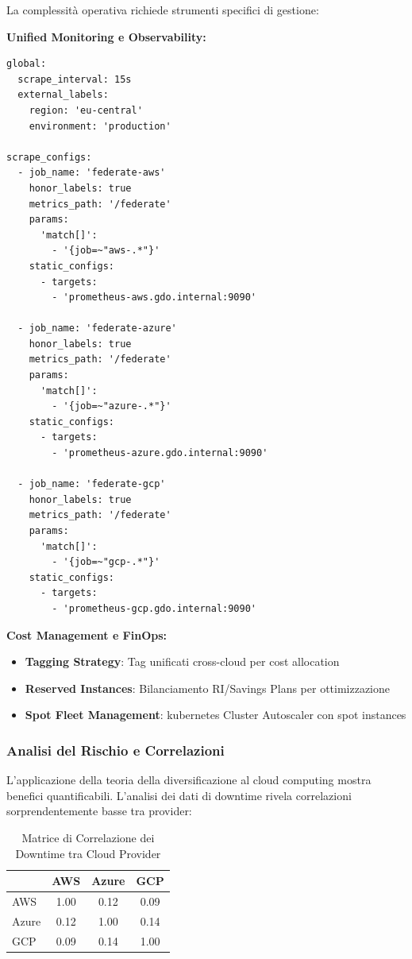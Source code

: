 La complessità operativa richiede strumenti specifici di gestione:

\textbf{Unified Monitoring e Observability:}
\begin{lstlisting}[caption={Prometheus Federation per Multi-Cloud},label={lst:prometheus_federation}]
global:
  scrape_interval: 15s
  external_labels:
    region: 'eu-central'
    environment: 'production'

scrape_configs:
  - job_name: 'federate-aws'
    honor_labels: true
    metrics_path: '/federate'
    params:
      'match[]':
        - '{job=~"aws-.*"}'
    static_configs:
      - targets:
        - 'prometheus-aws.gdo.internal:9090'
        
  - job_name: 'federate-azure'
    honor_labels: true
    metrics_path: '/federate'
    params:
      'match[]':
        - '{job=~"azure-.*"}'
    static_configs:
      - targets:
        - 'prometheus-azure.gdo.internal:9090'
        
  - job_name: 'federate-gcp'
    honor_labels: true
    metrics_path: '/federate'
    params:
      'match[]':
        - '{job=~"gcp-.*"}'
    static_configs:
      - targets:
        - 'prometheus-gcp.gdo.internal:9090'
\end{lstlisting}

\textbf{Cost Management e FinOps:}
\begin{itemize}
    \item \textbf{Tagging Strategy}: Tag unificati cross-cloud per cost allocation
    \item \textbf{Reserved Instances}: Bilanciamento RI/Savings Plans per ottimizzazione
    \item \textbf{Spot Fleet Management}: \gls{kubernetes} Cluster Autoscaler con spot instances
\end{itemize}

\subsubsection{\texorpdfstring{\textbf{Analisi del Rischio e Correlazioni}}{3.4.2.4 - Analisi del Rischio e Correlazioni}}

L'applicazione della teoria della diversificazione\autocite{Tang2024portfolio} al cloud computing mostra benefici quantificabili. L'analisi dei dati di downtime rivela correlazioni sorprendentemente basse tra provider:

\begin{table}[htbp]
\centering
\caption{Matrice di Correlazione dei Downtime tra Cloud Provider}
\label{tab:cloud_correlation}
\begin{tabular}{lccc}
\toprule
& AWS & Azure & GCP \\
\midrule
AWS & 1.00 & 0.12 & 0.09 \\
Azure & 0.12 & 1.00 & 0.14 \\
GCP & 0.09 & 0.14 & 1.00 \\
\bottomrule
\end{tabular}
\end{table}

